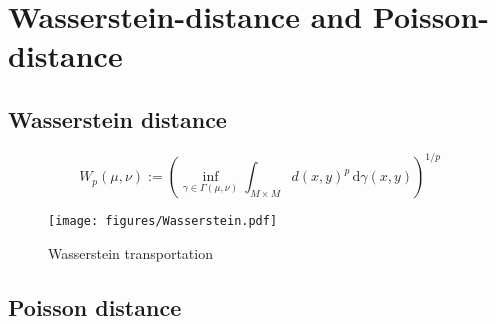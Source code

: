 \section{Wasserstein-distance and Poisson-distance} %
\subsection{Wasserstein distance}
\label{sub:Wasserstein distance}
    \begin{equation}
        W_{p}(\mu ,\nu ):=\left(\inf _{\gamma \in \Gamma (\mu ,\nu )}\int _{M\times M}d(x,y)^{p}\,\mathrm {d} \gamma (x,y)\right)^{1/p}
        \label{eq:w-dist-def}
    \end{equation}
    \begin{figure}[H]
        \centering
            \texttt{[image: figures/Wasserstein.pdf]}
        \caption{Wasserstein transportation}
        \label{fig:Wasserstein transportation}
    \end{figure}
\subsection{Poisson distance}
